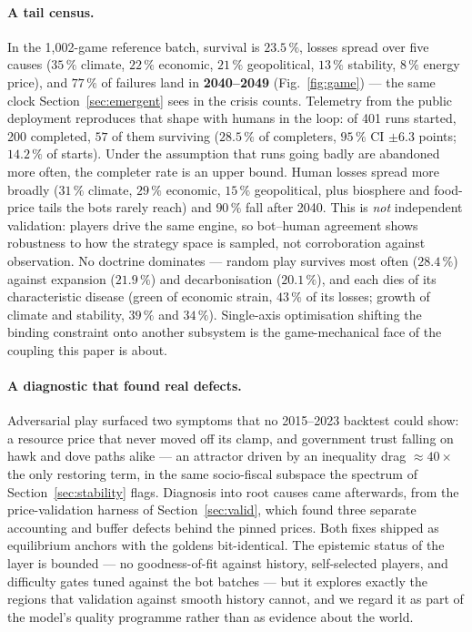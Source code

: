 \documentclass[12pt,a4paper]{article}
\begin{document}
\paragraph{A tail census.} In the 1{,}002-game reference batch, survival is $23.5\,\%$, losses
spread over five causes ($35\,\%$ climate, $22\,\%$ economic, $21\,\%$ geopolitical, $13\,\%$
stability, $8\,\%$ energy price), and $77\,\%$ of failures land in \textbf{2040--2049}
(Fig.~\ref{fig:game}) --- the same clock Section~\ref{sec:emergent} sees in the crisis counts.
Telemetry from the public deployment reproduces that shape with humans in the loop: of 401
runs started, 200 completed, $57$ of them surviving ($28.5\,\%$ of completers, $95\,\%$ CI
${\pm}6.3$ points; $14.2\,\%$ of starts). Under the assumption that runs going badly are
abandoned more often, the completer rate is an upper bound. Human losses spread more broadly
($31\,\%$ climate, $29\,\%$ economic, $15\,\%$ geopolitical, plus biosphere and food-price
tails the bots rarely reach) and $90\,\%$ fall after 2040. This is \emph{not} independent
validation: players drive the same engine, so bot--human agreement shows robustness to how the
strategy space is sampled, not corroboration against observation. No doctrine dominates ---
random play survives most often ($28.4\,\%$) against expansion ($21.9\,\%$) and decarbonisation
($20.1\,\%$), and each dies of its characteristic disease (green of economic strain, $43\,\%$
of its losses; growth of climate and stability, $39\,\%$ and $34\,\%$). Single-axis
optimisation shifting the binding constraint onto another subsystem is the game-mechanical face
of the coupling this paper is about.

\paragraph{A diagnostic that found real defects.} Adversarial play surfaced two symptoms that
no 2015--2023 backtest could show: a resource price that never moved off its clamp, and
government trust falling on hawk and dove paths alike --- an attractor driven by an inequality
drag ${\approx}40\times$ the only restoring term, in the same socio-fiscal subspace the
spectrum of Section~\ref{sec:stability} flags. Diagnosis into root causes came afterwards, from
the price-validation harness of Section~\ref{sec:valid}, which found three separate accounting
and buffer defects behind the pinned prices. Both fixes shipped as equilibrium anchors with the
goldens bit-identical. The epistemic status of the layer is bounded --- no goodness-of-fit
against history, self-selected players, and difficulty gates tuned against the bot batches ---
but it explores exactly the regions that validation against smooth history cannot, and we
regard it as part of the model's quality programme rather than as evidence about the world.
\end{document}
